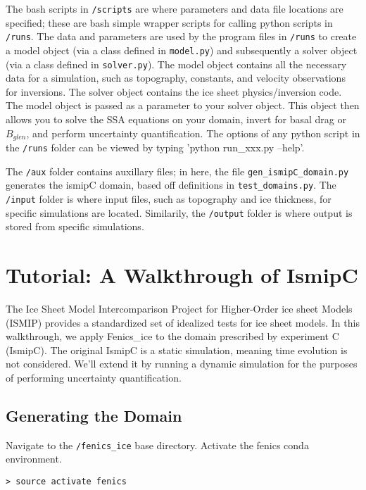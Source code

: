 \documentclass[11pt, reqno, nocenter]{article}
\begin{document}
The bash scripts in {\tt /scripts} are where parameters and data file locations are specified; these are bash simple wrapper scripts for calling python scripts in {\tt /runs}. The data and parameters are used by the program files in {\tt /runs} to create a model object (via a class defined in {\tt model.py}) and subsequently a solver object (via a class defined in {\tt solver.py}). The model object contains all the necessary data for a simulation, such as topography, constants, and velocity observations for inversions. The solver object contains the ice sheet physics/inversion code. The model object is passed as a parameter to your solver object. This object then allows you to solve the SSA equations on your domain, invert for basal drag or $B_{glen}$, and perform uncertainty quantification. The options of any python script in the {\tt /runs} folder can be viewed by typing 'python run\_xxx.py --help'.


The {\tt /aux} folder contains auxillary files; in here, the file {\tt gen\_ismipC\_domain.py} generates the ismipC domain,  based off definitions in {\tt test\_domains.py}. The {\tt /input} folder is where input files, such as topography and ice thickness, for specific simulations are located. Similarily, the {\tt /output} folder is where output is stored from specific simulations.

\section{Tutorial: A Walkthrough of IsmipC}

The Ice Sheet Model Intercomparison Project for Higher-Order ice sheet Models (ISMIP) provides a standardized set of idealized tests for ice sheet models. In this walkthrough, we apply Fenics\_ice to the domain prescribed by experiment C (IsmipC). The original IsmipC is a static simulation, meaning time evolution is not considered. We'll extend it by running a dynamic simulation for the purposes of performing uncertainty quantification.


\subsection{Generating the Domain}

Navigate to the {\tt /fenics\_ice} base directory. Activate the fenics conda environment.

\begin{verbatim}
> source activate fenics 
\end{verbatim}
\end{document}
